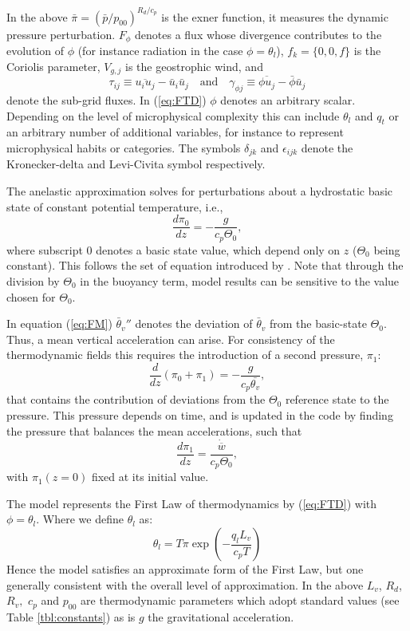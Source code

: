 \documentclass[11pt,a4paper]{article}
\begin{document}
In the above $\bar{\pi}=(\bar{p}/p_{00})^{R_d/c_p}$ is the exner function,
it measures the dynamic pressure perturbation.
$F_\phi$ denotes a flux whose divergence contributes to the evolution
of $\phi$ (for instance radiation in the case $\phi = \theta_l$),
$f_k = \{0,0,f\}$ is the Coriolis parameter, $V_{g,j}$ is the
geostrophic wind, and
\begin{equation}
\tau_{ij} \equiv \overline{u_i u_j} - \bar{u}_i \bar{u}_j \quad
\text{and} \quad \gamma_{\phi j} \equiv \overline{\phi u_j} -
\bar{\phi} \bar{u}_j
\end{equation}
denote the sub-grid fluxes.  In (\ref{eq:FTD}) $\phi$ denotes an
arbitrary scalar.  Depending on the level of microphysical complexity
this can include $\theta_l$ and $q_t$ or an arbitrary number of
additional variables, for instance to represent microphysical habits
or categories.  The symbols $\delta_{jk}$ and $\epsilon_{ijk}$ denote
the Kronecker-delta and Levi-Civita symbol respectively.

The anelastic approximation solves for perturbations about a
hydrostatic basic state of constant potential temperature, i.e.,
\begin{equation}
\frac{d\pi_0}{dz} = -\frac{g}{c_p\Theta_0},
\end{equation}
where subscript $0$ denotes a basic state value, which depend only on
$z$ ($\Theta_0$ being constant). This follows the set of equation introduced by \cite{Ogura:1962}. Note that through the division by $\Theta_0$ in the buoyancy term, model results can be sensitive to the value chosen for $\Theta_0$.

In equation (\ref{eq:FM}) $\bar{\theta}_v''$
denotes the deviation of $\bar \theta_v$ from the basic-state $\Theta_0$. Thus, a mean
vertical acceleration can arise.  For consistency of the thermodynamic fields this requires the
introduction of a second pressure, $\pi_1:$
\begin{equation}
\frac{d}{dz}(\pi_0 + \pi_1) = -\frac{g}{c_p\bar{\theta_v}},
\end{equation}
that contains the contribution of deviations from the $\Theta_0$
reference state to the pressure.  This pressure depends on time, and
is updated in the code by finding the pressure that balances the mean
accelerations, such that
\begin{equation}
\frac{d\pi_1}{dz} = \frac{\dot{\overline{w}}}{c_p \Theta_0} ,
\end{equation}
with $\pi_1(z=0)$ fixed at its initial value.

The model represents the First Law of thermodynamics by (\ref{eq:FTD})
with $\phi=\theta_l.$  Where we define $\theta_l$ as:
\begin{equation}
\theta_l = T\pi \exp\left(-\frac{q_lL_v}{c_pT} \right)
\label{eq:thetal}
\end{equation} 
Hence the model satisfies an approximate form of the First Law, but
one generally consistent with the overall level of approximation. In
the above $L_v$, $R_d$, $R_v,$ $c_p$ and $p_{00}$ are thermodynamic
parameters which adopt standard values (see Table \ref{tbl:constants})
as is $g$ the gravitational acceleration.
\end{document}
